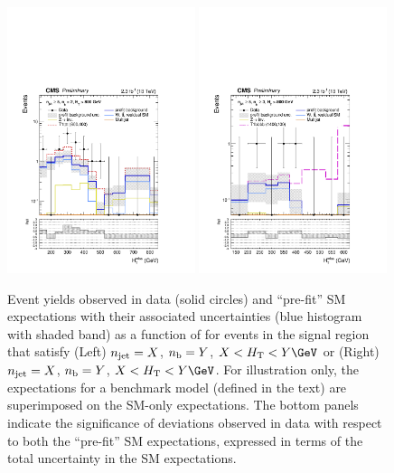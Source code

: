 \begin{figure}[tbhp]
  \begin{center}
    \includegraphics[width=0.49\textwidth]{figures/mht_shapes/v0/postFitShape_eq2b_ge5j_800_Inf_prefit_T1tttt_800_400} 
    \includegraphics[width=0.49\textwidth]{figures/mht_shapes/v0/postFitShape_ge3b_ge5j_800_Inf_prefit_T1bbbb_1400_100} \\
  \end{center}
  \caption{Event yields observed in data (solid circles) and
    ``pre-fit'' SM expectations with their associated uncertainties
    (blue histogram with shaded band) as a function of \HTmiss for
    events in the signal region that satisfy (Left) $n_{\text{jet}} = X$, $n_{\text{b}}
    = Y$, $X < \scalht < Y\GeV$ or (Right) $n_{\text{jet}} = X$, $n_{\text{b}} = Y$, $X
    < \scalht < Y\GeV$. For illustration only, the expectations for a
    benchmark model (defined in the text) are superimposed on the
    SM-only expectations. The bottom panels indicate the significance
    of deviations observed in data with respect to both the
    ``pre-fit'' SM expectations, expressed in terms of the total
    uncertainty in the SM expectations. }
    \label{fig:mht-templates} 
\end{figure}
